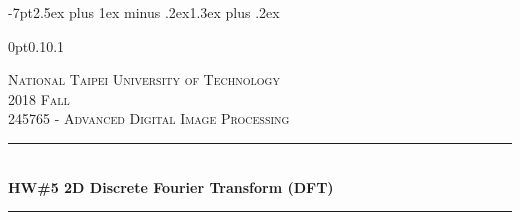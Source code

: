 \titlespacing*{\section} {-7pt}{2.5ex plus 1ex minus .2ex}{1.3ex plus .2ex}

\titlespacing*{\subsection}
{0pt}{0.1\baselineskip}{0.1\baselineskip}




\begin{titlepage} %
	\newcommand{\HRule}{\rule{\linewidth}{0.5mm}} %
		
	\center %
		
		
	\textsc{\LARGE National Taipei University of Technology}\\[1.5cm] %
		
	\textsc{\Large 2018 Fall}\\[0.5cm] %
		
	\textsc{\large 245765 - Advanced Digital Image Processing}\\[0.5cm] %
		
		
	\HRule\\[0.4cm]
		
	{\huge\bfseries HW\#5 2D Discrete Fourier Transform (DFT)}\\[0.4cm] %
		
	\HRule\\[1.5cm]
		

\end{titlepage}
